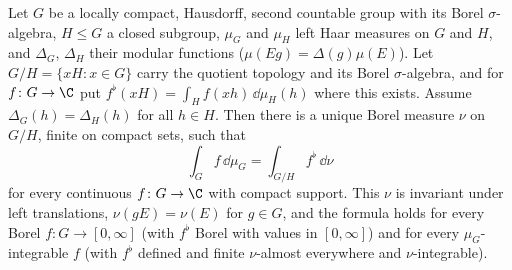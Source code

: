 Let $G$ be a locally compact, Hausdorff, second countable group with its Borel $\sigma$-algebra, $H\le G$ a closed subgroup,
$\mu_G$ and $\mu_H$ left Haar measures on $G$ and $H$, and $\Delta_G$, $\Delta_H$ their modular functions
($\mu(Eg)=\Delta(g)\mu(E)$). Let $G/H=\{xH:x\in G\}$ carry the quotient topology and its Borel $\sigma$-algebra, and for
$f\colon G\to\C$ put $f^\flat(xH)=\int_Hf(xh)\,\dd\mu_H(h)$ where this exists. Assume $\Delta_G(h)=\Delta_H(h)$ for all
$h\in H$. Then there is a unique Borel measure $\nu$ on $G/H$, finite on compact sets, such that
\[
  \int_Gf\,\dd\mu_G=\int_{G/H}f^\flat\,\dd\nu
\]
for every continuous $f\colon G\to\C$ with compact support. This $\nu$ is invariant under left translations,
$\nu(gE)=\nu(E)$ for $g\in G$, and the formula holds for every Borel $f\colon G\to[0,\infty]$ (with $f^\flat$ Borel with values in
$[0,\infty]$) and for every $\mu_G$-integrable $f$ (with $f^\flat$ defined and finite $\nu$-almost everywhere and $\nu$-integrable).
